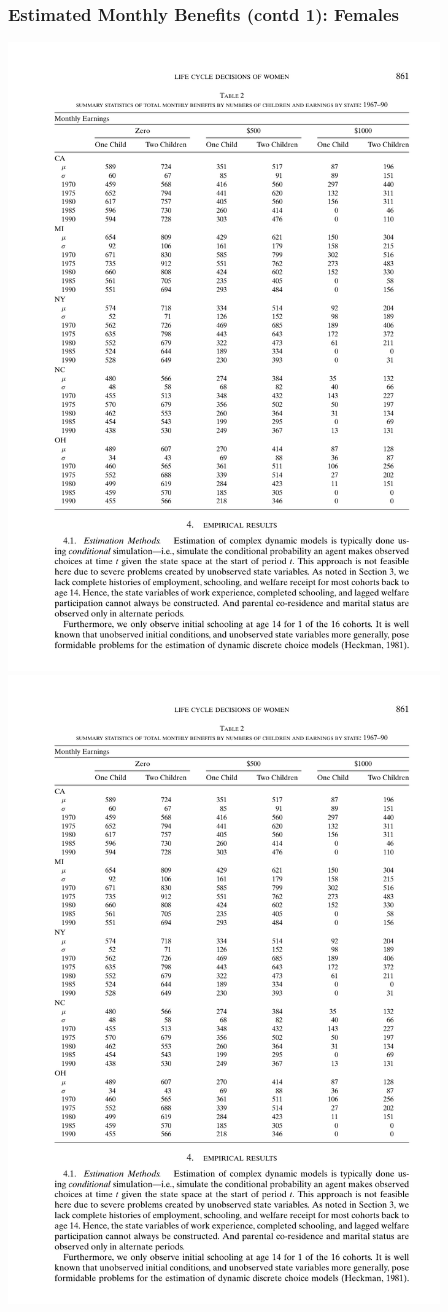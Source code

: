 \begin{frame}
	\frametitle{Estimated Monthly Benefits (contd 1): Females}
	\includegraphics[width=4.5in]{tab-figs/table2b_2010-1} \\
	\includegraphics[width=4.5in]{tab-figs/table2b__2010} \\

\end{frame}
